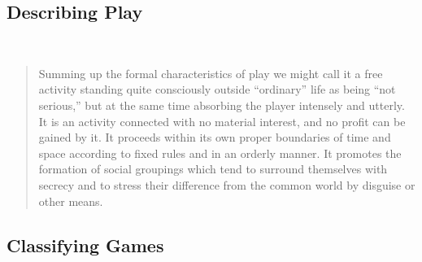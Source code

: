 \begin{frame}[standout]
    \onslide<+->
\end{frame}



\subsection{Describing Play}

\begin{frame}{\insertsection\ \insertsubsection}
    \onslide<+->
    \blockquote[\cite{suits1978GrasshopperGamesLife,huizinga1964HomoLudensStudy}]{Summing up the formal characteristics of play we might call it a free activity standing quite consciously outside “ordinary” life as being “not serious,” but at the same time absorbing the player intensely and utterly. It is an activity connected with no material interest, and no profit can be gained by it. It proceeds within its own proper boundaries of time and space according to fixed rules and in an orderly manner. It promotes the formation of social groupings which tend to surround themselves with secrecy and to stress their difference from the common world by disguise or other means.}
\end{frame}



\subsection{Classifying Games}

